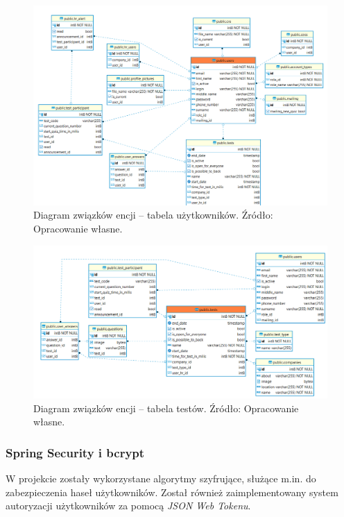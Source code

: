 \documentclass[twoside]{projektInzynierskiMS}
\numberwithin{figure}{section}
\begin{document}
\newpage

\begin{figure}[h!]
    \centering
    \includegraphics[width=\textwidth]{images/erp_users.png}
    \caption{Diagram związków encji -- tabela użytkowników. Źródło: Opracowanie własne.}
    \label{fig:erp_tests}
\end{figure}

\begin{figure}[h!]
    \centering
    \includegraphics[width=\textwidth]{images/erp_tests.png}
    \caption{Diagram związków encji -- tabela testów. Źródło: Opracowanie własne.}
    \label{fig:erp_users}
\end{figure}

\subsubsection{Spring Security i bcrypt}
W projekcie zostały wykorzystane algorytmy szyfrujące, służące m.in. do zabezpieczenia haseł użytkowników. Został również zaimplementowany system autoryzacji użytkowników za pomocą \textit{JSON Web Tokenu}.
\end{document}
